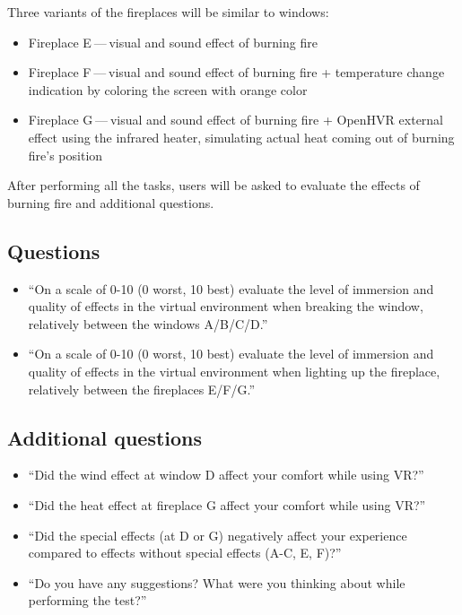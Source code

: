 Three variants of the fireplaces will be similar to windows:


\begin{itemize}

\item Fireplace E — visual and sound effect of burning fire

\item Fireplace F — visual and sound effect of burning fire + temperature change
indication by coloring the screen with orange color

\item Fireplace G — visual and sound effect of burning fire + OpenHVR
external effect using the infrared heater, simulating actual heat coming
out of burning fire’s position

\end{itemize}


After performing all the tasks, users will be asked to evaluate the
effects of burning fire and additional questions.


\hypertarget{x-questions}{\subsection{Questions}}
\begin{itemize}

\item ``On a scale of 0-10 (0 worst, 10 best) evaluate the level of immersion and quality
of effects in the virtual environment when breaking the window, relatively
between the windows A/B/C/D.''

\item ``On a scale of 0-10 (0 worst, 10 best) evaluate the level of immersion and quality
of effects in the virtual environment when lighting up the fireplace, relatively
between the fireplaces E/F/G.''

\end{itemize}


\hypertarget{x-additional-questions}{\subsection{Additional questions}}
\begin{itemize}

\item ``Did the wind effect at window D affect your comfort while using VR?''

\item ``Did the heat effect at fireplace G affect your comfort while using VR?''

\item ``Did the special effects (at D or G) negatively affect your experience
compared to effects without special effects (A-C, E, F)?''

\item ``Do you have any suggestions? What were you thinking about while performing
the test?''

\end{itemize}


